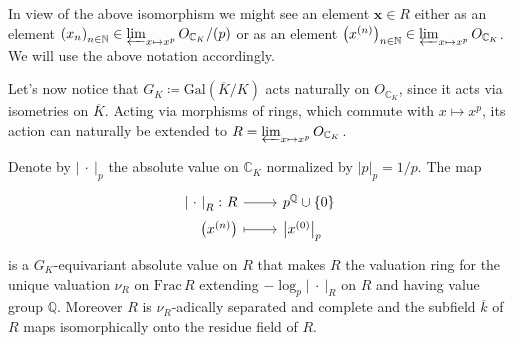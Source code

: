 \begin{ntt}[]\label{not:tiltingElts}
	In view of the above isomorphism we might see an element $\mathbf{x} \in R$
	either as an element 
	$\left( x_n \right)_{n \in \mathbb{N}} \in \varprojlim_{x \mapsto x^p} O_{\mathbb{C}_K}/ (p)$
	or as an element
	$\left( x^{(n)} \right)_{n \in \mathbb{N}} \in \varprojlim_{x \mapsto x^p} O_{\mathbb{C}_K}$.
	We will use the above notation accordingly.
\end{ntt}


\begin{rem}[]\label{rem:GKActionR}
	Let's now notice that $G_K \coloneqq \mathrm{Gal}\left( \overline{K} / K \right)$
	acts naturally on $O_{\mathbb{C}_K}$, since it acts via isometries on
	$\overline{K}$.
	Acting via morphisms of rings, which commute with $x \mapsto x^p$,
	its action can naturally be extended to
	$R = \varprojlim_{x \mapsto x^p} O_{\mathbb{C}_K}$.
\end{rem}


\begin{lem}
	Denote by $\left| \ \cdot \ \right|_p$ the absolute value on $\mathbb{C}_K$
	normalized by $\left| p \right|_p = 1/p$.
	The map
	\begin{equation*}
	\begin{tikzcd}[row sep = 0ex
		,/tikz/column 1/.append style={anchor=base east}
		,/tikz/column 2/.append style={anchor=base west}]
		\left| \ \cdot \ \right|_R\colon R \arrow[r, "", rightarrow] &
		p^{\mathbb{Q}} \cup \left\{ 0 \right\} \\
		\left( x^{(n)} \right) \arrow[r, "", mapsto] & 
		\left| x^{(0)} \right|_p
	\end{tikzcd}
	\end{equation*} 
	is a $G_K$-equivariant absolute value on $R$ that makes
	$R$ the valuation ring for the unique valuation
	$\nu_R$ on $\mathrm{Frac}\, R$ extending
	$-\log_p \left| \ \cdot \ \right|_R$ on $R$
	and having value group $\mathbb{Q}$.
	Moreover $R$ is $\nu_R$-adically separated and complete
	and the subfield $\overline{k}$ of $R$ maps
	isomorphically onto the residue field of $R$.
\end{lem} 


